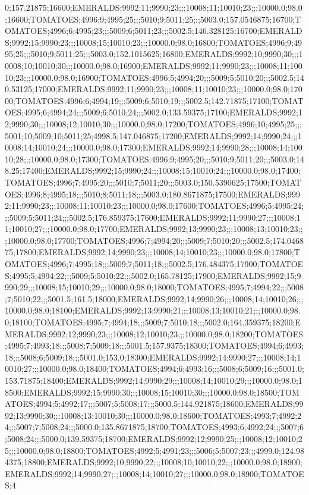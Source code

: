 0;157.21875;16600;EMERALDS;9992;11;9990;23;;;10008;11;10010;23;;;10000.0;98.0;16600;TOMATOES;4996;9;4995;25;;;5010;9;5011;25;;;5003.0;157.0546875;16700;TOMATOES;4996;6;4995;23;;;5009;6;5011;23;;;5002.5;146.328125;16700;EMERALDS;9992;15;9990;23;;;10008;15;10010;23;;;10000.0;98.0;16800;TOMATOES;4996;9;4995;25;;;5010;9;5011;25;;;5003.0;152.1015625;16800;EMERALDS;9992;10;9990;30;;;10008;10;10010;30;;;10000.0;98.0;16900;EMERALDS;9992;11;9990;23;;;10008;11;10010;23;;;10000.0;98.0;16900;TOMATOES;4996;5;4994;20;;;5009;5;5010;20;;;5002.5;140.53125;17000;EMERALDS;9992;11;9990;23;;;10008;11;10010;23;;;10000.0;98.0;17000;TOMATOES;4996;6;4994;19;;;5009;6;5010;19;;;5002.5;142.71875;17100;TOMATOES;4995;6;4994;24;;;5009;6;5010;24;;;5002.0;133.59375;17100;EMERALDS;9992;12;9990;30;;;10008;12;10010;30;;;10000.0;98.0;17200;TOMATOES;4996;10;4995;25;;;5001;10;5009;10;5011;25;4998.5;147.046875;17200;EMERALDS;9992;14;9990;24;;;10008;14;10010;24;;;10000.0;98.0;17300;EMERALDS;9992;14;9990;28;;;10008;14;10010;28;;;10000.0;98.0;17300;TOMATOES;4996;9;4995;20;;;5010;9;5011;20;;;5003.0;148.25;17400;EMERALDS;9992;15;9990;24;;;10008;15;10010;24;;;10000.0;98.0;17400;TOMATOES;4996;7;4995;20;;;5010;7;5011;20;;;5003.0;150.5390625;17500;TOMATOES;4996;8;4995;18;;;5010;8;5011;18;;;5003.0;180.8671875;17500;EMERALDS;9992;11;9990;23;;;10008;11;10010;23;;;10000.0;98.0;17600;TOMATOES;4996;5;4995;24;;;5009;5;5011;24;;;5002.5;176.859375;17600;EMERALDS;9992;11;9990;27;;;10008;11;10010;27;;;10000.0;98.0;17700;EMERALDS;9992;13;9990;23;;;10008;13;10010;23;;;10000.0;98.0;17700;TOMATOES;4996;7;4994;20;;;5009;7;5010;20;;;5002.5;174.046875;17800;EMERALDS;9992;14;9990;23;;;10008;14;10010;23;;;10000.0;98.0;17800;TOMATOES;4996;7;4995;18;;;5009;7;5011;18;;;5002.5;176.484375;17900;TOMATOES;4995;5;4994;22;;;5009;5;5010;22;;;5002.0;165.78125;17900;EMERALDS;9992;15;9990;29;;;10008;15;10010;29;;;10000.0;98.0;18000;TOMATOES;4995;7;4994;22;;;5008;7;5010;22;;;5001.5;161.5;18000;EMERALDS;9992;14;9990;26;;;10008;14;10010;26;;;10000.0;98.0;18100;EMERALDS;9992;13;9990;21;;;10008;13;10010;21;;;10000.0;98.0;18100;TOMATOES;4995;7;4994;18;;;5009;7;5010;18;;;5002.0;164.359375;18200;EMERALDS;9992;12;9990;23;;;10008;12;10010;23;;;10000.0;98.0;18200;TOMATOES;4995;7;4993;18;;;5008;7;5009;18;;;5001.5;157.9375;18300;TOMATOES;4994;6;4993;18;;;5008;6;5009;18;;;5001.0;153.0;18300;EMERALDS;9992;14;9990;27;;;10008;14;10010;27;;;10000.0;98.0;18400;TOMATOES;4994;6;4993;16;;;5008;6;5009;16;;;5001.0;153.71875;18400;EMERALDS;9992;14;9990;29;;;10008;14;10010;29;;;10000.0;98.0;18500;EMERALDS;9992;15;9990;30;;;10008;15;10010;30;;;10000.0;98.0;18500;TOMATOES;4994;5;4992;17;;;5007;5;5008;17;;;5000.5;144.921875;18600;EMERALDS;9992;13;9990;30;;;10008;13;10010;30;;;10000.0;98.0;18600;TOMATOES;4993;7;4992;24;;;5007;7;5008;24;;;5000.0;135.8671875;18700;TOMATOES;4993;6;4992;24;;;5007;6;5008;24;;;5000.0;139.59375;18700;EMERALDS;9992;12;9990;25;;;10008;12;10010;25;;;10000.0;98.0;18800;TOMATOES;4992;5;4991;23;;;5006;5;5007;23;;;4999.0;124.984375;18800;EMERALDS;9992;10;9990;22;;;10008;10;10010;22;;;10000.0;98.0;18900;EMERALDS;9992;14;9990;27;;;10008;14;10010;27;;;10000.0;98.0;18900;TOMATOES;4
